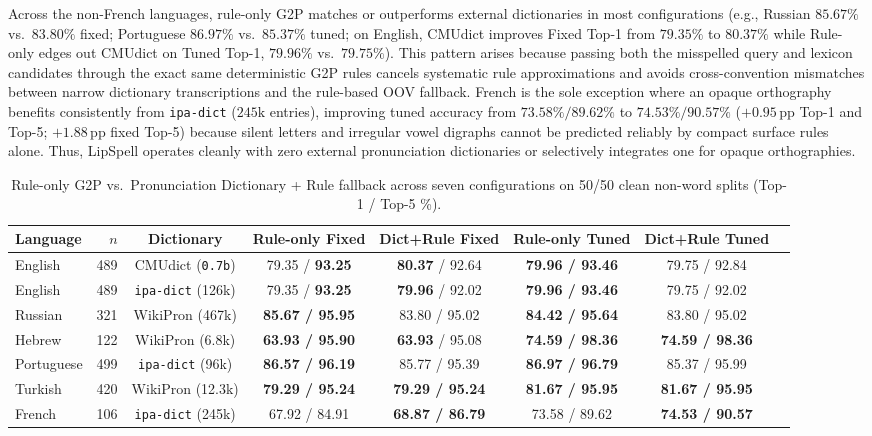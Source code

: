 \documentclass[preprint,12pt,authoryear]{elsarticle}
\begin{document}
Across the non-French languages, rule-only G2P matches or outperforms external dictionaries in most configurations (e.g., Russian $85.67\%$ vs.\ $83.80\%$ fixed; Portuguese $86.97\%$ vs.\ $85.37\%$ tuned; on English, CMUdict improves Fixed Top-1 from $79.35\%$ to $80.37\%$ while Rule-only edges out CMUdict on Tuned Top-1, $79.96\%$ vs.\ $79.75\%$). This pattern arises because passing both the misspelled query and lexicon candidates through the exact same deterministic G2P rules cancels systematic rule approximations and avoids cross-convention mismatches between narrow dictionary transcriptions and the rule-based OOV fallback. French is the sole exception where an opaque orthography benefits consistently from \texttt{ipa-dict} ($245\text{k}$ entries), improving tuned accuracy from $73.58\% / 89.62\%$ to $74.53\% / 90.57\%$ ($+0.95$\,pp Top-1 and Top-5; $+1.88$\,pp fixed Top-5) because silent letters and irregular vowel digraphs cannot be predicted reliably by compact surface rules alone. Thus, LipSpell operates cleanly with zero external pronunciation dictionaries or selectively integrates one for opaque orthographies.

\begin{table}[ht]
\centering
\scriptsize
\setlength{\tabcolsep}{2.8pt}
\caption{Rule-only G2P vs.\ Pronunciation Dictionary + Rule fallback across seven configurations on 50/50 clean non-word splits (Top-1 / Top-5 \%).}
\label{tab:g2p_ablation}
\begin{tabular}{lrcccccc}
\toprule
Language & $n$ & Dictionary & Rule-only Fixed & Dict+Rule Fixed & Rule-only Tuned & Dict+Rule Tuned \\
\midrule
English    & 489 & CMUdict (\texttt{0.7b})  & 79.35 / \textbf{93.25} & \textbf{80.37} / 92.64 & \textbf{79.96 / 93.46} & 79.75 / 92.84 \\
English    & 489 & \texttt{ipa-dict} (126k) & 79.35 / \textbf{93.25} & \textbf{79.96} / 92.02 & \textbf{79.96 / 93.46} & 79.75 / 92.02 \\
Russian    & 321 & WikiPron (467k)   & \textbf{85.67 / 95.95} & 83.80 / 95.02 & \textbf{84.42 / 95.64} & 83.80 / 95.02 \\
Hebrew     & 122 & WikiPron (6.8k)   & \textbf{63.93 / 95.90} & \textbf{63.93} / 95.08 & \textbf{74.59 / 98.36} & \textbf{74.59 / 98.36} \\
Portuguese & 499 & \texttt{ipa-dict} (96k)  & \textbf{86.57 / 96.19} & 85.77 / 95.39 & \textbf{86.97 / 96.79} & 85.37 / 95.99 \\
Turkish    & 420 & WikiPron (12.3k)  & \textbf{79.29 / 95.24} & \textbf{79.29 / 95.24} & \textbf{81.67 / 95.95} & \textbf{81.67 / 95.95} \\
French     & 106 & \texttt{ipa-dict} (245k) & 67.92 / 84.91 & \textbf{68.87 / 86.79} & 73.58 / 89.62 & \textbf{74.53 / 90.57} \\
\bottomrule
\end{tabular}
\end{table}
\end{document}
